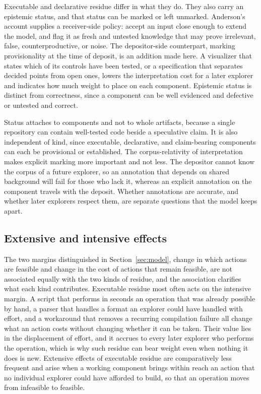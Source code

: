 \documentclass[11pt]{article}
\theoremstyle{definition}
\theoremstyle{remark}
\begin{document}
Executable and declarative residue differ in what they do. They also carry an epistemic status, and that status can be marked or left unmarked. Anderson's account supplies a receiver-side policy: accept an input close enough to extend the model, and flag it as fresh and untested knowledge that may prove irrelevant, false, counterproductive, or noise. The depositor-side counterpart, marking provisionality at the time of deposit, is an addition made here. A visualizer that states which of its controls have been tested, or a specification that separates decided points from open ones, lowers the interpretation cost for a later explorer and indicates how much weight to place on each component. Epistemic status is distinct from correctness, since a component can be well evidenced and defective or untested and correct.

Status attaches to components and not to whole artifacts, because a single repository can contain well-tested code beside a speculative claim. It is also independent of kind, since executable, declarative, and claim-bearing components can each be provisional or established. The corpus-relativity of interpretation makes explicit marking more important and not less. The depositor cannot know the corpus of a future explorer, so an annotation that depends on shared background will fail for those who lack it, whereas an explicit annotation on the component travels with the deposit. Whether annotations are accurate, and whether later explorers respect them, are separate questions that the model keeps apart.

\subsection{Extensive and intensive effects}\label{sec:margins}

The two margins distinguished in Section~\ref{sec:model}, change in which actions are feasible and change in the cost of actions that remain feasible, are not associated equally with the two kinds of residue, and the association clarifies what each kind contributes. Executable residue most often acts on the intensive margin. A script that performs in seconds an operation that was already possible by hand, a parser that handles a format an explorer could have handled with effort, and a workaround that removes a recurring compilation failure all change what an action costs without changing whether it can be taken. Their value lies in the displacement of effort, and it accrues to every later explorer who performs the operation, which is why such residue can bear weight even when nothing it does is new. Extensive effects of executable residue are comparatively less frequent and arise when a working component brings within reach an action that no individual explorer could have afforded to build, so that an operation moves from infeasible to feasible.
\end{document}
